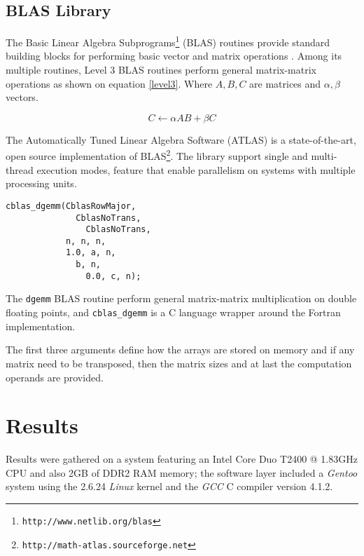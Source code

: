 \documentclass[a4paper,twocolumn]{article}
\begin{document}
\subsection{BLAS Library}

The Basic Linear Algebra Subprograms\footnote{\tt http://www.netlib.org/blas}
(BLAS) routines provide standard building blocks for performing basic 
vector and matrix operations \cite{blas}. Among its multiple routines, 
Level 3 BLAS routines perform general matrix-matrix operations as shown on 
equation \ref{level3}. Where $ A,B,C $ are matrices and $ \alpha, \beta $ 
vectors.

\begin{equation}
C \leftarrow \alpha A B + \beta C
\label{level3}
\end{equation}

\smallskip

The Automatically Tuned Linear Algebra Software (ATLAS) is a state-of-the-art, open source implementation of BLAS\footnote{\tt http://math-atlas.sourceforge.net}. The library support single and multi-thread execution modes, feature that
enable parallelism on systems with multiple processing units.

\begin{verbatim}
cblas_dgemm(CblasRowMajor,
              CblasNoTrans,
                CblasNoTrans,
            n, n, n,
            1.0, a, n,
              b, n,
                0.0, c, n);
\end{verbatim}

The {\tt dgemm} BLAS routine perform general matrix-matrix multiplication on 
double floating points, and {\tt cblas\_dgemm} is a C language wrapper around 
the Fortran implementation. 

\smallskip

The first three arguments define how the arrays are stored on memory and if 
any matrix need to be transposed, then the matrix sizes and at last the 
computation operands are provided.

\section{Results}

Results were gathered on a system featuring an Intel Core Duo T2400 @ 1.83GHz 
CPU and also 2GB of DDR2 RAM memory; the software layer included a {\it Gentoo}
system using the 2.6.24 {\it Linux} kernel and the {\it GCC} C compiler 
version 4.1.2.

\smallskip
\end{document}
